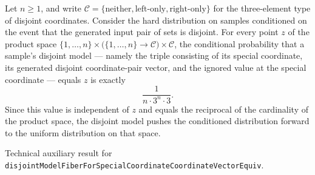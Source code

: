 \begin{theorem}
\label{CommunicationComplexity.Functions.Disjointness.RandomizedLowerBound.disjointCondMeasure_measureReal_disjointModel_fiber}
\leanok
{}
Let $n \ge 1$, and write $\mathcal{C} = \{\text{neither}, \text{left-only},
\text{right-only}\}$ for the three-element type of disjoint coordinates. Consider the
hard distribution on samples conditioned on the event that the generated input pair of
sets is disjoint. For every point $z$ of the product space $\{1,\dots,n\} \times
\bigl(\{1,\dots,n\} \to \mathcal{C}\bigr) \times \mathcal{C}$, the conditional
probability that a sample's disjoint model — namely the triple consisting of its special
coordinate, its generated disjoint coordinate-pair vector, and the ignored value at the
special coordinate — equals $z$ is exactly
\[ \frac{1}{n \cdot 3^{n} \cdot 3}. \]
Since this value is independent of $z$ and equals the reciprocal of the cardinality of
the product space, the disjoint model pushes the conditioned distribution forward to the
uniform distribution on that space.
\end{theorem}

\begin{definition}[Disjointmodelfiberforspecialcoordinatecoordinatevectorequiv]
\label{CommunicationComplexity.Functions.Disjointness.RandomizedLowerBound.disjointModelFiberForSpecialCoordinateCoordinateVectorEquiv}
\leanok
Technical auxiliary result for \texttt{disjointModelFiberForSpecialCoordinateCoordinateVectorEquiv}.
\end{definition}

